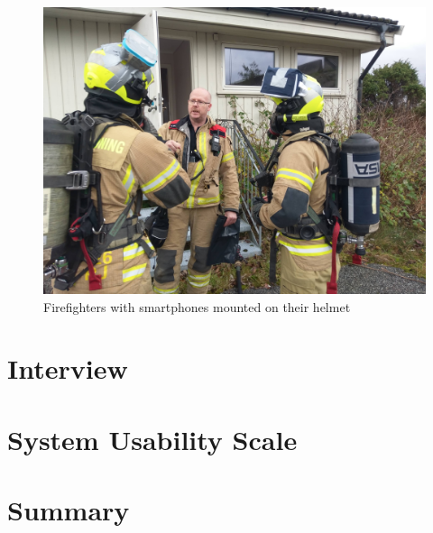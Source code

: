 \documentclass[../Main/thesis.tex]{subfiles}
\begin{document}
\begin{figure}[h]
	\centering
	\includegraphics[width=\textwidth]{../fig/firefighters-with-helmet}
	\caption{Firefighters with smartphones mounted on their helmet}
	\label{fig:eval-firefighters}
\end{figure}

\section{Interview}

\section{System Usability Scale}

\section{Summary}
\end{document}
